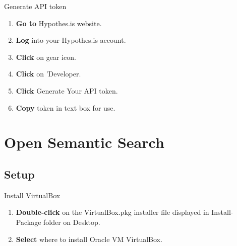 \documentclass[10pt,a4paper]{article}
\begin{document}
\begin{textbox}{Generate API token}
 

  

\begin{enumerate}
\item \textbf{Go to} Hypothes.is website. 
\item \textbf{Log} into your Hypothes.is account.
\item \textbf{Click} on gear icon.
\item \textbf{Click} on 'Developer.
\item \textbf{Click} Generate Your API token.
\item \textbf{Copy} token in text box for use.

\end{enumerate}

\end{textbox}


\section{Open Semantic Search}
\subsection{Setup}


\begin{textbox}{Install VirtualBox}
 

  


\begin{enumerate}
\item \textbf {Double-click} on the VirtualBox.pkg installer file displayed in Install-Package folder on Desktop.
\item \textbf {Select} where to install Oracle VM VirtualBox.

\end{enumerate}


\end{textbox}
\end{document}
